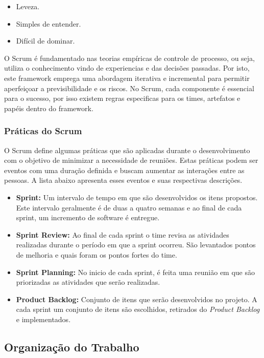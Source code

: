 \begin{itemize}
    \item Leveza.
    \item Simples de entender.
    \item Difícil de dominar.
\end{itemize}

O Scrum é fundamentado nas teorias empíricas de controle de processo, ou seja,
utiliza o conhecimento vindo de experiencias e das decisões passadas. Por isto, este 
framework emprega uma abordagem iterativa e incremental para permitir aperfeiçoar
a previsibilidade e os riscos. No Scrum, cada componente é essencial
para o sucesso, por isso existem regras especificas para os times, artefatos e
papéis dentro do framework.


\subsubsection{Práticas do Scrum}
\label{est:sof:met:pra}

O Scrum define algumas práticas que são aplicadas durante o desenvolvimento com 
o objetivo de minimizar a necessidade de reuniões. Estas práticas podem ser eventos
com uma duração definida e buscam aumentar as interações entre as pessoas. A lista
abaixo apresenta esses eventos e suas respectivas descrições.

\begin{itemize}
    \item \textbf{Sprint:} Um intervalo de tempo em que são desenvolvidos os itens
        propostos. Este intervalo geralmente é de duas a quatro semanas e ao final
        de cada sprint, um incremento de software é entregue.
    \item \textbf{Sprint Review:} Ao final de cada sprint o time revisa as atividades
        realizadas durante o período em que a sprint ocorreu. São levantados pontos de
        melhoria e quais foram os pontos fortes do time.
    \item \textbf{Sprint Planning:} No inicio de cada sprint, é feita uma reunião em
        que são priorizadas as atividades que serão realizadas.
    \item \textbf{Product Backlog:} Conjunto de itens que serão desenvolvidos no projeto.
        A cada sprint um conjunto de itens são escolhidos, retirados do \textit{Product
        Backlog} e implementados.
\end{itemize}

\subsection{Organização do Trabalho}
\label{est:sof:org}

